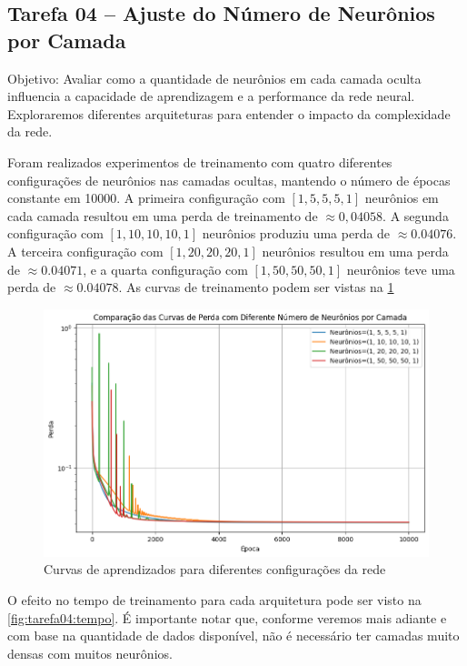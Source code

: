 \subsection{Tarefa 04 -- Ajuste do Número de Neurônios por Camada}

\begin{comandoquestao}
	Objetivo: Avaliar como a quantidade de neurônios em cada camada oculta 
	influencia a capacidade de aprendizagem e a performance da rede neural. 
	Exploraremos diferentes arquiteturas para entender o impacto da 
	complexidade da 	rede.
\end{comandoquestao}

Foram realizados experimentos de treinamento com quatro diferentes 
configurações de neurônios nas camadas ocultas, mantendo o número de épocas 
constante em 10000. A primeira configuração com $[1, 5, 5, 5, 1]$ neurônios em 
cada camada resultou em uma perda de treinamento de $\approx 0,04058$. A 
segunda configuração com $[1, 10, 10, 10, 1]$ neurônios produziu uma perda de 
$\approx 0.04076$. A terceira configuração com $[1, 20, 20, 20, 1]$ neurônios 
resultou em 
uma perda de $\approx 0.04071$, e a quarta configuração com $[1, 50, 50, 50, 
1]$ neurônios 
teve uma perda de $\approx 0.04078$. As curvas de treinamento podem ser vistas 
na \cref{fig:tarefa04:curvas}

\begin{figure}[tbh]
	\centering
	\caption{Curvas de aprendizados para diferentes configurações da rede}
	\label{fig:tarefa04:curvas}
	\includegraphics[width=0.7\linewidth]{./0803_imgs/png-241110-190844867-15619254497487317135.png}
\end{figure}

O efeito no tempo de treinamento para cada arquitetura pode ser visto na 
\cref{fig:tarefa04:tempo}. É importante notar que, conforme 
veremos mais adiante e com base na quantidade de dados disponível, não é 
necessário ter camadas muito densas com muitos neurônios.

